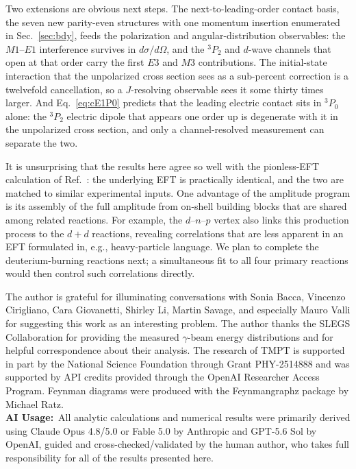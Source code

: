 \documentclass[
  aps,prd,twocolumn,nofootinbib,superscriptaddress,
  longbibliography,floatfix,preprintnumbers
]{revtex4-2}
\newcommand{\Mone}{M1}
\newcommand{\Eone}{E1}
\newcommand{\Ethree}{E3}
\newcommand{\Mthree}{M3}
\begin{document}
Two extensions are obvious next steps. The next-to-leading-order contact basis, the seven new
parity-even structures with one momentum insertion enumerated in Sec.~\ref{sec:bdy},
feeds the polarization and angular-distribution observables: the
$\Mone$--$\Eone$ interference survives in $d\sigma/d\Omega$, and the $^{3}P_{2}$ and
$d$-wave channels that open at that order carry the first $\Ethree$ and $\Mthree$ contributions.
The initial-state interaction that
the unpolarized cross section sees as a sub-percent correction is a twelvefold
cancellation, so a $J$-resolving observable sees it some thirty times larger. And
Eq.~\eqref{eq:cE1P0} predicts that the leading electric contact sits in $^{3}P_{0}$
alone: the $^{3}P_{2}$ electric dipole that appears one order up is degenerate with
it in the unpolarized cross section, and only a channel-resolved measurement can
separate the two.

It is unsurprising that the results here agree so well with the pionless-EFT
calculation of Ref.~\cite{Rupak:1999rk}: the underlying EFT is practically
identical, and the two are matched to similar experimental inputs.
One advantage of the amplitude program is its assembly of the full amplitude from
on-shell building blocks that are shared among related reactions.  For example,
the $d$--$n$--$p$ vertex also links this production process 
to the $d+d$ reactions, revealing correlations that are less apparent in an EFT formulated in, e.g.,
heavy-particle language.  We plan to complete the deuterium-burning reactions next; a simultaneous fit
to all four primary reactions would then control such correlations directly.

\begin{acknowledgments}

The author is grateful for illuminating conversations with Sonia Bacca, Vincenzo Cirigliano, 
Cara Giovanetti, Shirley Li, Martin Savage, and especially Mauro Valli for suggesting this work as an interesting problem.
The author thanks the SLEGS Collaboration for providing the measured $\gamma$-beam energy distributions and for helpful correspondence about their analysis.
The research of TMPT is supported in part by the National Science Foundation through Grant PHY-2514888
and was supported by API credits provided through the OpenAI Researcher Access Program.
Feynman diagrams were produced with the Feynmangraphz package by Michael Ratz.\\

\noindent
{\bf AI Usage:}~All analytic calculations and numerical results were primarily derived using Claude Opus 4.8/5.0 or Fable 5.0 by Anthropic and GPT-5.6 Sol by OpenAI, 
guided and cross-checked/validated by the human author, who takes full responsibility for all of the results presented here.
\end{acknowledgments}
\end{document}
